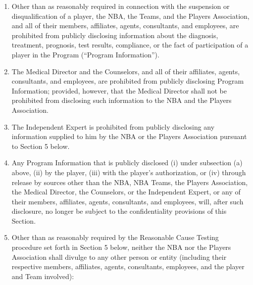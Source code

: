 \documentclass[
]{book}
\providecommand{\tightlist}{%
  \setlength{\itemsep}{0pt}\setlength{\parskip}{0pt}}
\begin{document}
\begin{enumerate}
\def\labelenumi{(\alph{enumi})}
\tightlist
\item
  Other than as reasonably required in connection with the suspension or disqualification of a player, the NBA, the Teams, and the Players Association, and all of their members, affiliates, agents, consultants, and employees, are prohibited from publicly disclosing information about the diagnosis, treatment, prognosis, test results, compliance, or the fact of participation of a player in the Program (``Program Information'').
\item
  The Medical Director and the Counselors, and all of their affiliates, agents, consultants, and employees, are prohibited from publicly disclosing Program Information; provided, however, that the Medical Director shall not be prohibited from disclosing such information to the NBA and the Players Association.
\item
  The Independent Expert is prohibited from publicly disclosing any information supplied to him by the NBA or the Players Association pursuant to Section 5 below.
\item
  Any Program Information that is publicly disclosed (i) under subsection (a) above, (ii) by the player, (iii) with the player's authorization, or (iv) through release by sources other than the NBA, NBA Teams, the Players Association, the Medical Director, the Counselors, or the Independent Expert, or any of their members, affiliates, agents, consultants, and employees, will, after such disclosure, no longer be subject to the confidentiality provisions of this Section.
\item
  Other than as reasonably required by the Reasonable Cause Testing procedure set forth in Section 5 below, neither the NBA nor the Players Association shall divulge to any other person or entity (including their respective members, affiliates, agents, consultants, employees, and the player and Team involved):


\end{enumerate}
\end{document}
